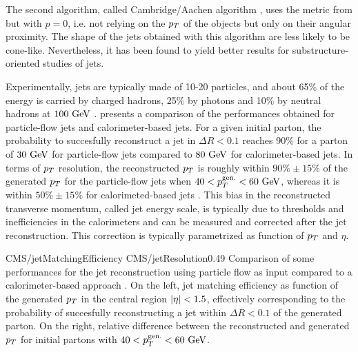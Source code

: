        The second algorithm, called Cambridge/Aachen algorithm \cite{CA}, uses the metric from
         but with $p = 0$, i.e. not relying on the $p_T$ of
        the objects but only on their angular proximity. The shape of the jets obtained with
        this algorithm are less likely to be cone-like. Nevertheless, it has been found to
        yield better results for substructure-oriented studies of jets.


        Experimentally, jets are typically made of 10-20 particles, and about 65\% of the
        energy is carried by charged hadrons, 25\% by photons and 10\% by neutral hadrons
        at $100~\text{GeV}$ \cite{JetPerf}.
         presents a comparison of the performances obtained
        for particle-flow jets and calorimeter-based jets. For a given initial parton, the
        probability to succesfully reconstruct a jet in $\Delta R < 0.1$ reaches 90\% for
        a parton of $30~\text{GeV}$ for particle-flow jets compared to $80~\text{GeV}$ for
        calorimeter-based jets. In terms of $p_T$ resolution, the reconstructed $p_T$ is
        roughly within $90\% \pm 15\%$ of the generated $p_T$ for the particle-flow jets
        when $40 < p_T^\text{gen.} < 60~\text{GeV}$, whereas it is within $50\% \pm 15\%$ for
        calorimeted-based jets \cite{particleFlow}. This bias in the reconstructed transverse momentum, called
        jet energy scale, is typically due to thresholds and inefficiencies in the calorimeters
        and can be measured and corrected after the jet reconstruction. This correction is
        typically parametrized as function of $p_T$ and $\eta$.

        {CMS/jetMatchingEfficiency}
        {CMS/jetResolution}{0.49}
        {Comparison of some performances for the jet reconstruction using particle flow as
        input compared to a calorimeter-based approach \cite{particleFlow}. On the left, jet matching efficiency
        as function of the generated $p_T$ in the central region $\left| \eta \right| < 1.5$, effectively
        corresponding to the probability of succesfully reconstructing a jet within
        $\Delta R < 0.1$ of the generated parton. On the right, relative difference between
        the reconstructed and generated $p_T$ for initial partons with $40 < p_T^\text{gen.} < 60~\text{GeV}$.
        }

